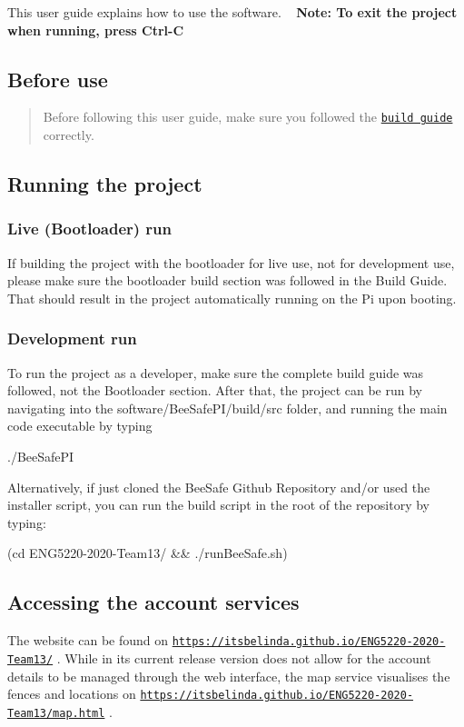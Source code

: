 This user guide explains how to use the software. ~\newline
 {\bfseries Note\+: To exit the project when running, press {\ttfamily Ctrl-\/C}}

\subsection*{Before use}

\begin{quote}
Before following this user guide, make sure you followed the \href{https://github.com/itsBelinda/ENG5220-2020-Team13/wiki/Build-Guide}{\tt build guide} correctly. \end{quote}


\subsection*{Running the project}

\subsubsection*{Live (Bootloader) run}

If building the project with the bootloader for live use, not for development use, please make sure the bootloader build section was followed in the Build Guide. That should result in the project automatically running on the Pi upon booting.

\subsubsection*{Development run}

To run the project as a developer, make sure the complete build guide was followed, not the Bootloader section. After that, the project can be run by navigating into the {\ttfamily software/\+Bee\+Safe\+P\+I/build/src} folder, and running the main code executable by typing 
\begin{DoxyCode}
./BeeSafePI
\end{DoxyCode}
 Alternatively, if just cloned the Bee\+Safe Github Repository and/or used the installer script, you can run the build script in the root of the repository by typing\+: 
\begin{DoxyCode}
(cd ENG5220-2020-Team13/ && ./runBeeSafe.sh)
\end{DoxyCode}
 \subsection*{Accessing the account services}

The website can be found on \href{https://itsbelinda.github.io/ENG5220-2020-Team13/}{\tt https\+://itsbelinda.\+github.\+io/\+E\+N\+G5220-\/2020-\/\+Team13/} . While in its current release version does not allow for the account details to be managed through the web interface, the map service visualises the fences and locations on \href{https://itsbelinda.github.io/ENG5220-2020-Team13/map.html}{\tt https\+://itsbelinda.\+github.\+io/\+E\+N\+G5220-\/2020-\/\+Team13/map.\+html} . 